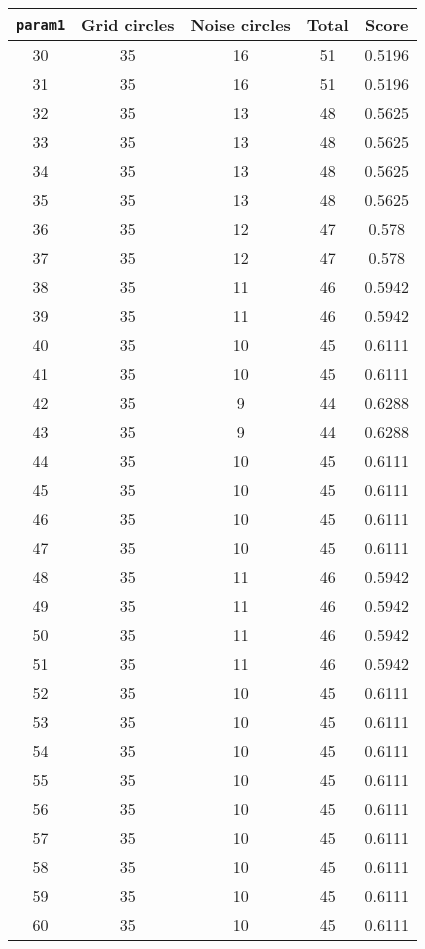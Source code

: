\documentclass[letterpaper, 12pt]{article}
\begin{document}
\begin{longtable}{|c|c|c|c|c|}
\hline
\textbf{\texttt{param1}} & \textbf{Grid circles} & \textbf{Noise circles} & \textbf{Total} & \textbf{Score} \\
\hline
30 & 35 & 16 & 51 & 0.5196 \\
\hline
31 & 35 & 16 & 51 & 0.5196 \\
\hline
32 & 35 & 13 & 48 & 0.5625 \\
\hline
33 & 35 & 13 & 48 & 0.5625 \\
\hline
34 & 35 & 13 & 48 & 0.5625 \\
\hline
35 & 35 & 13 & 48 & 0.5625 \\
\hline
36 & 35 & 12 & 47 & 0.578 \\
\hline
37 & 35 & 12 & 47 & 0.578 \\
\hline
38 & 35 & 11 & 46 & 0.5942 \\
\hline
39 & 35 & 11 & 46 & 0.5942 \\
\hline
40 & 35 & 10 & 45 & 0.6111 \\
\hline
41 & 35 & 10 & 45 & 0.6111 \\
\hline
42 & 35 & 9 & 44 & 0.6288 \\
\hline
43 & 35 & 9 & 44 & 0.6288 \\
\hline
44 & 35 & 10 & 45 & 0.6111 \\
\hline
45 & 35 & 10 & 45 & 0.6111 \\
\hline
46 & 35 & 10 & 45 & 0.6111 \\
\hline
47 & 35 & 10 & 45 & 0.6111 \\
\hline
48 & 35 & 11 & 46 & 0.5942 \\
\hline
49 & 35 & 11 & 46 & 0.5942 \\
\hline
50 & 35 & 11 & 46 & 0.5942 \\
\hline
51 & 35 & 11 & 46 & 0.5942 \\
\hline
52 & 35 & 10 & 45 & 0.6111 \\
\hline
53 & 35 & 10 & 45 & 0.6111 \\
\hline
54 & 35 & 10 & 45 & 0.6111 \\
\hline
55 & 35 & 10 & 45 & 0.6111 \\
\hline
56 & 35 & 10 & 45 & 0.6111 \\
\hline
57 & 35 & 10 & 45 & 0.6111 \\
\hline
58 & 35 & 10 & 45 & 0.6111 \\
\hline
59 & 35 & 10 & 45 & 0.6111 \\
\hline
60 & 35 & 10 & 45 & 0.6111 \\

\end{longtable}
\end{document}
